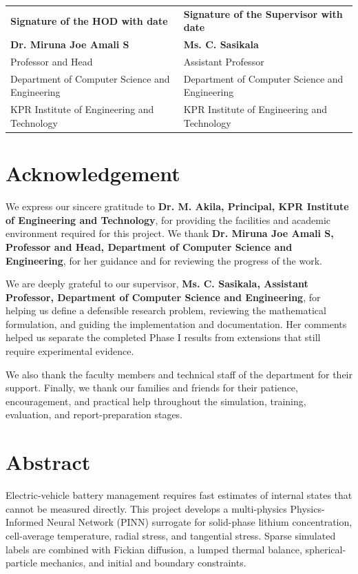 \documentclass[14pt,a4paper,oneside]{extreport}
\begin{document}
\vspace{3.0cm}
\noindent
\begin{tabularx}{\textwidth}{X X}
\textbf{Signature of the HOD with date} & \textbf{Signature of the Supervisor with date}\\[1.4cm]
\textbf{Dr. Miruna Joe Amali S} & \textbf{Ms. C. Sasikala}\\
Professor and Head & Assistant Professor\\
Department of Computer Science and Engineering & Department of Computer Science and Engineering\\
KPR Institute of Engineering and Technology & KPR Institute of Engineering and Technology
\end{tabularx}

\clearpage
\chapter*{Acknowledgement}
\label{pre:ack}
We express our sincere gratitude to \textbf{Dr. M. Akila, Principal, KPR Institute of Engineering and Technology}, for providing the facilities and academic environment required for this project. We thank \textbf{Dr. Miruna Joe Amali S, Professor and Head, Department of Computer Science and Engineering}, for her guidance and for reviewing the progress of the work.

We are deeply grateful to our supervisor, \textbf{Ms. C. Sasikala, Assistant Professor, Department of Computer Science and Engineering}, for helping us define a defensible research problem, reviewing the mathematical formulation, and guiding the implementation and documentation. Her comments helped us separate the completed Phase I results from extensions that still require experimental evidence.

We also thank the faculty members and technical staff of the department for their support. Finally, we thank our families and friends for their patience, encouragement, and practical help throughout the simulation, training, evaluation, and report-preparation stages.

\clearpage
\chapter*{Abstract}
\label{pre:abstract}
Electric-vehicle battery management requires fast estimates of internal states that cannot be measured directly. This project develops a multi-physics Physics-Informed Neural Network (PINN) surrogate for solid-phase lithium concentration, cell-average temperature, radial stress, and tangential stress. Sparse simulated labels are combined with Fickian diffusion, a lumped thermal balance, spherical-particle mechanics, and initial and boundary constraints.
\end{document}
